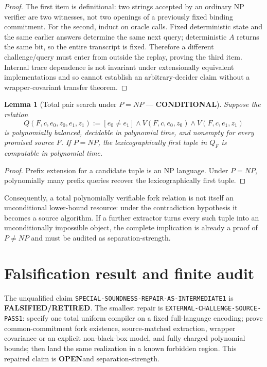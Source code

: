 \documentclass[11pt]{article}
\newtheorem{lemma}{Lemma}
\newcommand{\COND}{\textbf{CONDITIONAL}}
\newcommand{\OPEN}{\textbf{OPEN}}
\newcommand{\RETIRED}{\textbf{FALSIFIED/RETIRED}}
\begin{document}
\begin{proof}
The first item is definitional: two strings accepted by an ordinary NP
verifier are two witnesses, not two openings of a previously fixed binding
commitment.  For the second, induct on oracle calls.  Fixed deterministic
state and the same earlier answers determine the same next query; deterministic
$A$ returns the same bit, so the entire transcript is fixed.  Therefore a
different challenge/query must enter from outside the replay, proving the
third item.  Internal trace dependence is not invariant under extensionally
equivalent implementations and so cannot establish an arbitrary-decider
claim without a wrapper-covariant transfer theorem.
\end{proof}

\begin{lemma}[Total pair search under $P=NP$ --- \COND]
Suppose the relation
\[
 Q(F,c,e_0,z_0,e_1,z_1)
 :=[e_0\ne e_1]\wedge V(F,c,e_0,z_0)\wedge V(F,c,e_1,z_1)
\]
is polynomially balanced, decidable in polynomial time, and nonempty for
every promised source $F$.  If $P=NP$, the lexicographically first tuple in
$Q_F$ is computable in polynomial time.
\end{lemma}
\begin{proof}
Prefix extension for a candidate tuple is an NP language.  Under $P=NP$,
polynomially many prefix queries recover the lexicographically first tuple.
\end{proof}

Consequently, a total polynomially verifiable fork relation is not itself an
unconditional lower-bound resource: under the contradiction hypothesis it
becomes a source algorithm.  If a further extractor turns every such tuple
into an unconditionally impossible object, the complete implication is
already a proof of $P\ne NP$ and must be audited as separation-strength.

\section{Falsification result and finite audit}
The unqualified claim
\texttt{SPECIAL-SOUNDNESS-REPAIR-AS-INTERMEDIATE1} is \RETIRED.  The smallest
repair is \texttt{EXTERNAL-CHALLENGE-SOURCE-PASS1}: specify one total uniform
compiler on a fixed full-language encoding; prove common-commitment fork
existence, source-matched extraction, wrapper covariance or an explicit
non-black-box model, and fully charged polynomial bounds; then land the same
realization in a known forbidden region.  This repaired claim is \OPEN and
separation-strength.
\end{document}
